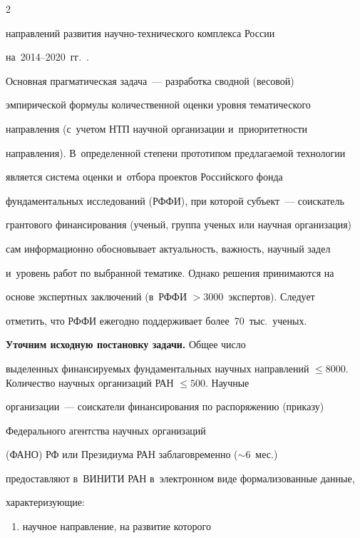 \begin{multicols}{2}
\begin{itemize}
направлений развития на\-уч\-но-тех\-ни\-че\-ско\-го комплекса России 

на~2014--2020~гг.~\cite{9-sun}. 

\end{itemize}



    Основная прагматическая задача~--- разработка сводной (весовой) 

эмпирической формулы количественной оценки уровня тематического 

направления (с~учетом НТП научной организации и~приоритет\-ности 

направления). В~определенной степени прототипом предлагаемой технологии 

является сис\-те\-ма оценки и~отбора проектов Российского фонда 

фундаментальных исследований (РФФИ), при которой субъект~--- соискатель 

грантового финансирования (ученый, группа ученых или научная организация) 

сам информационно обосновывает актуальность, важ\-ность, научный задел 

и~уровень работ по выбранной тематике. Однако решения принимаются на 

основе экспертных заключений (в~РФФИ $> 3000$~экспертов). Следует 

отметить, что РФФИ ежегодно поддерживает более~70~тыс.\ ученых. 

    

    \textbf{Уточним исходную постановку задачи.} Общее число 

выделенных финансируемых фундаментальных научных на\-прав\-ле\-ний $\leq 

8000$. Количество научных организаций РАН $\leq 500$. Научные 

организации~--- соискатели финансирования по распоряжению (приказу) 

Федерального агентства научных организаций

(ФАНО) РФ или Президиума РАН заблаговременно ($\sim6$~мес.)\ 

предоставляют в~\mbox{ВИНИТИ} РАН в~электронном виде формализованные данные, 

характеризующие:

\begin{enumerate}[(1)]

\item научное на\-прав\-ле\-ние, на развитие которого 


\end{enumerate}
\end{multicols}
